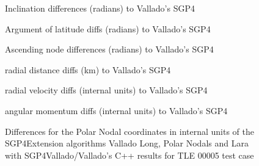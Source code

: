 \documentclass{article}
\begin{document}
\begin{figure}
  \begin{minipage}[b]{.48\linewidth}
    \centering
    
    \centerline{Inclination differences (radians) to Vallado's SGP4}\medskip
  \end{minipage}
  \hfill
  \begin{minipage}[b]{0.48\linewidth}
    \centering
      
  \centerline{Argument of latitude diffs (radians) to Vallado's SGP4}\medskip
  \end{minipage}
  \hfill
  \begin{minipage}[b]{0.48\linewidth}
    \centering
      
  \centerline{Ascending node differences (radians) to Vallado's SGP4}\medskip
  \end{minipage}
  \hfill
  \begin{minipage}[b]{0.48\linewidth}
    \centering
      
    \centerline{radial distance diffs (km) to Vallado's SGP4}\medskip
  \end{minipage}
  \hfill
  \begin{minipage}[b]{0.48\linewidth}
    \centering
      
    \centerline{radial velocity diffs (internal units) to Vallado's SGP4}\medskip
  \end{minipage}
  \hfill
  \begin{minipage}[b]{0.48\linewidth}
    \centering
      
    \centerline{angular momentum diffs (internal units) to Vallado's SGP4}\medskip
  \end{minipage}
  \caption{Differences for the Polar Nodal coordinates in internal units of the SGP4Extension algorithms Vallado Long, Polar Nodals and  Lara with SGP4Vallado/Vallado's C++ results for TLE 00005 test case}
\label{fig:pn0005}
\end{figure}





\end{document}
